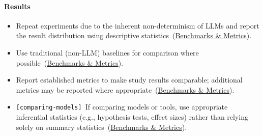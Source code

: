 \documentclass[smallextended]{svjour3}
\makeatletter
\newcommand{\must}{\textbf{must}\xspace}
\newcommand{\should}{\textbf{should}\xspace}
\newcommand{\iconS}{\usebox{\iconSbox}\xspace}
\newcommand{\iconS}{○\xspace}
\newcommand{\condition}[1]{\texttt{\small[#1]}\,}
\newcommand{\condition}[1]{@@cond:#1@@}
\newcommand{\refbenchmarks}{\hyperref[sec:use-suitable-baselines-benchmarks-and-metrics]{Benchmarks \& Metrics}}
\newcommand{\refbenchmarks}{\href{/guidelines/benchmarks-metrics/}{Benchmarks \& Metrics}}
\makeatother
\begin{document}
\begin{appendices}
\paragraph{\textbf{Results}}
\begin{itemize}[label={},leftmargin=*]
    \item \iconS Repeat experiments due to the inherent non-determinism of LLMs and report the result distribution using descriptive statistics~(\refbenchmarks).
    \item \iconS Use traditional (non-LLM) baselines for comparison where possible~(\refbenchmarks).
    \item \iconS Report established metrics to make study results comparable; additional metrics may be reported where appropriate~(\refbenchmarks).
    \item \iconS \condition{comparing-models} If comparing models or tools, use appropriate inferential statistics (e.g., hypothesis tests, effect sizes) rather than relying solely on summary statistics~(\refbenchmarks).
\end{itemize}


\end{appendices}
\end{document}
